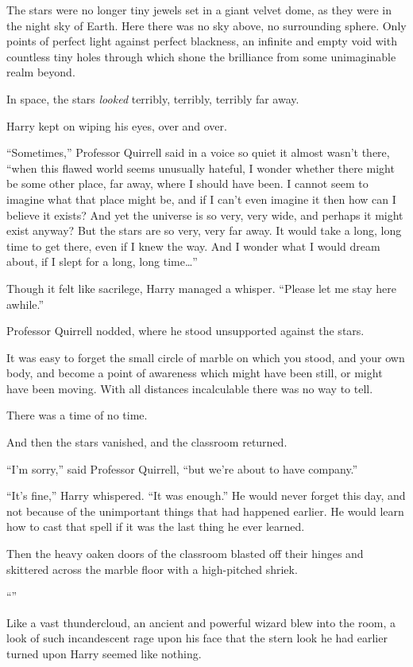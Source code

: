 The stars were no longer tiny jewels set in a giant velvet dome, as they were in the night sky of Earth. Here there was no sky above, no surrounding sphere. Only points of perfect light against perfect blackness, an infinite and empty void with countless tiny holes through which shone the brilliance from some unimaginable realm beyond.

In space, the stars \emph{looked} terribly, terribly, terribly far away.

Harry kept on wiping his eyes, over and over.

“Sometimes,” Professor Quirrell said in a voice so quiet it almost wasn’t there, “when this flawed world seems unusually hateful, I wonder whether there might be some other place, far away, where I should have been. I cannot seem to imagine what that place might be, and if I can’t even imagine it then how can I believe it exists? And yet the universe is so very, very wide, and perhaps it might exist anyway? But the stars are so very, very far away. It would take a long, long time to get there, even if I knew the way. And I wonder what I would dream about, if I slept for a long, long time…”

Though it felt like sacrilege, Harry managed a whisper.
“Please let me stay here awhile.”

Professor Quirrell nodded, where he stood unsupported against the stars.

It was easy to forget the small circle of marble on which you stood, and your own body, and become a point of awareness which might have been still, or might have been moving. With all distances incalculable there was no way to tell.

There was a time of no time.

And then the stars vanished, and the classroom returned.

“I’m sorry,” said Professor Quirrell, “but we’re about to have company.”

“It’s fine,” Harry whispered.
“It was enough.” He would never forget this day, and not because of the unimportant things that had happened earlier. He would learn how to cast that spell if it was the last thing he ever learned.

Then the heavy oaken doors of the classroom blasted off their hinges and skittered across the marble floor with a high-pitched shriek.

“”

Like a vast thundercloud, an ancient and powerful wizard blew into the room, a look of such incandescent rage upon his face that the stern look he had earlier turned upon Harry seemed like nothing.


